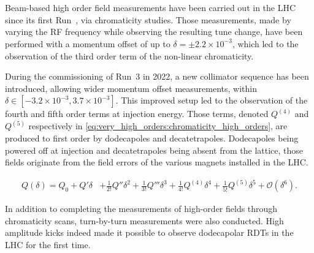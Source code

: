 \chapter{}
\thumbforchapter{}


\section{}

Beam-based high order field measurements have been carried out in the LHC since its first
Run~\cite{maclean_non-linear_2011, maclean_commissioning_2016-1}, via
chromaticity studies. Those measurements, made by varying the RF frequency while observing the
resulting tune change, have been performed with a momentum offset of up to $\delta = \pm 2.2 \times
10^{-3}$, which led to the observation of the third order term of the non-linear chromaticity.

During the commissioning of Run~3 in 2022, a new collimator sequence has been introduced, allowing wider
momentum offset measurements, within $\delta \in [-3.2\times 10^{-3},3.7 \times 10^{-3}]$. This
improved setup led to the observation of the fourth and fifth order terms at injection energy.
Those terms, denoted $Q^{(4)}$ and $Q^{(5)}$ respectively in
\cref{eq:very_high_orders:chromaticity_high_orders}, are produced to first order by dodecapoles and
decatetrapoles. Dodecapoles being powered off at injection and decatetrapoles being absent from the
lattice, those fields originate from the field errors of the various magnets installed in the LHC.

\begin{equation}
  \begin{aligned}
    Q(\delta) = Q_0 + Q'\delta &+ \frac{1}{2!}Q''\delta^2 + \frac{1}{3!}Q'''\delta^3
                                + \frac{1}{4!}Q^{(4)}\delta^4  + \frac{1}{5!}Q^{(5)}\delta^5
                                + \mathcal{O}(\delta^6).
  \end{aligned}
  \label{eq:very_high_orders:chromaticity_high_orders}
\end{equation}

In addition to completing the measurements of high-order fields through chromaticity scans,
turn-by-turn measurements were also conducted. High amplitude kicks indeed made it possible to
observe dodecapolar RDTs in the LHC for the first time.



